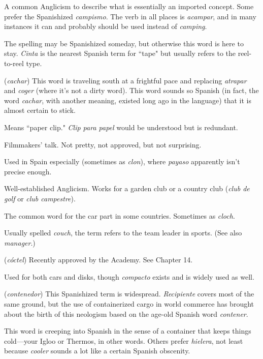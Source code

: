  A common Anglicism to describe what is essentially an imported concept. Some prefer the Spanishized \emph{campismo}.
The verb in all places is \emph{acampar}, and in many instances it can and
probably should be used instead of \emph{camping}.

 The spelling may be Spanishized someday, but
otherwise this word is here to stay. \emph{Cinta} is the nearest Spanish term
for ``tape" but usually refers to the reel-to-reel type.

 (\emph{cachar}) This word is traveling south at a frightful
pace and replacing \emph{atrapar} and \emph{coger} (where it's not a dirty word).
This word sounds so Spanish (in fact, the word \emph{cachar}, with another
meaning, existed long ago in the language) that it is almost certain to
stick.

 Means ``paper clip." \emph{Clip para papel} would be understood but is redundant.

 Filmmakers' talk. Not pretty, not approved, but
not surprising.

 Used in Spain especially (sometimes as \emph{clon}), where
\emph{payaso} apparently isn't precise enough.

 Well-established Anglicism. Works for a garden club or
a country club (\emph{club de golf} or \emph{club campestre}).

 The common word for the car part in some countries. Sometimes as \emph{cloch}.

 Usually spelled \emph{couch}, the term refers to the team
leader in sports. (See also \emph{manager}.)

 (\emph{cóctel}) Recently approved by the Academy. See
Chapter 14.

 Used for both cars and disks, though \emph{compacto} exists and is widely used as well.

 (\emph{contenedor}) This Spanishized term is widespread. \emph{Recipiente} covers most of the same ground, but the use of containerized cargo in world commerce has brought about the birth of this
neologism based on the age-old Spanish word \emph{contener}.

 This word is creeping into Spanish in the sense of
a container that keeps things cold---your Igloo or Thermos, in other
words. Others prefer \emph{hielera}, not least because \emph{cooler} sounds a lot like
a certain Spanish obscenity.


